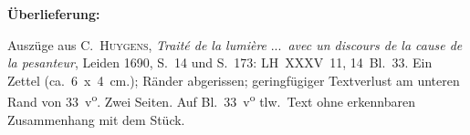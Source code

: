 %  
%
%	
%
%
%
%
\frenchspacing
%
\begin{ledgroupsized}[r]{120mm}
\footnotesize
\pstart
\noindent\textbf{Überlieferung:}
\pend
\end{ledgroupsized}
%
\begin{ledgroupsized}[r]{114mm}
\footnotesize
\pstart \parindent -6mm
%
Auszüge aus
\protect{}%
C.~\textsc{Huygens}, %
\cite{00525}\textit{Traité de la lumière} \lbrack...\rbrack\ \textit{avec un discours de la cause de la pesanteur}, %
Leiden 1690, S.~14 und S.~173:
%
LH~XXXV~11, 14~Bl.~33. 
Ein Zettel (ca.~6~x~4~cm.);
Ränder abgerissen;
geringfügiger Textverlust am unteren Rand von 33~v\textsuperscript{o}.
Zwei Seiten.
Auf Bl.~33~v\textsuperscript{o} tlw.\ Text ohne erkennbaren Zusammenhang mit dem Stück.
\pend
\end{ledgroupsized}
%
%
\count{}%
\count{}%
\count{} 
\vspace{5mm}
